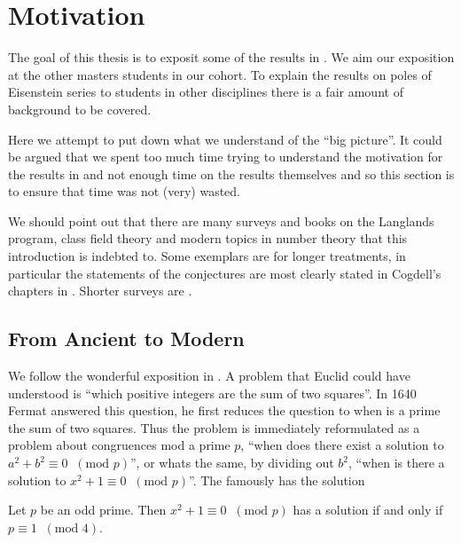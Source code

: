 \section*{Motivation}
The goal of this thesis is to exposit some of the results in \cite{jiangPolesCertainResidual2013}. We aim our exposition at the other masters students in our cohort.
To explain the results on poles of Eisenstein series to students in other disciplines there is a fair amount of background to be covered.

Here we attempt to put down what we understand of the ``big picture''. It could be argued that we spent too much time trying to understand the motivation for the results in \cite{jiangPolesCertainResidual2013} and not enough time on the results themselves and so this section is to ensure that time was not (very) wasted. 

We should point out that there are many surveys and books on the Langlands program, class field theory and modern topics in number theory that this introduction is indebted to. Some exemplars are \cite{fleigEisensteinSeriesAutomorphic2016, bumpIntroductionLanglandsProgram2004} for longer treatments, in particular the statements of the conjectures are most clearly stated in Cogdell's chapters in \cite{bumpIntroductionLanglandsProgram2004}. Shorter surveys are \cite{gelbartElementaryIntroductionLanglands1984, langlandsFunctorialityTheoryAutomorphic, langlandsRepresentationTheoryIts1989, arthurAUTOMORPHICREPRESENTATIONSNUMBER1981}.

\subsection{From Ancient to Modern}
We follow the wonderful exposition in \cite{weinsteinReciprocityLawsGalois2015}. A problem that Euclid could have understood is ``which positive integers are the sum of two squares''. In 1640 Fermat answered this question, he first reduces the question to when is a prime the sum of two squares. Thus the problem is immediately reformulated as a problem about congruences mod a prime \(p\), ``when does there exist a solution to \(a^2  +b^2 \equiv 0 \;\;(\text{mod }p) \)'', or whats the same, by dividing out \(b^2\), ``when is there a solution to \(x^2 + 1 \equiv 0 \;\;(\text{mod }p)\)''. The famously has the solution 
\begin{Theorem}
	Let \(p\) be an odd prime. Then \(x^2 + 1 \equiv 0 \;\;(\text{mod }p)\) has a solution if and only if \(p\equiv 1 \;\;(\text{mod }4) \).
\end{Theorem}

